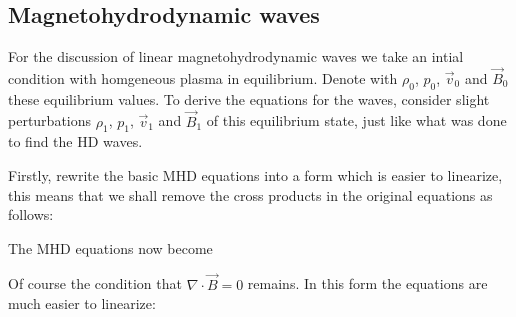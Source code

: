 \subsection{Magnetohydrodynamic waves}
For the discussion of linear magnetohydrodynamic waves we take an intial condition with homgeneous plasma in equilibrium.
Denote with $\rho_0$, $p_0$, $\vec{v}_0$ and $\vec{B}_0$ these equilibrium values. 
To derive the equations for the waves, consider slight perturbations $\rho_1$, $p_1$, $\vec{v}_1$ and $\vec{B}_1$ of this equilibrium state, just like what was done to find the HD waves.

Firstly, rewrite the basic MHD equations into a form which is easier to linearize,
this means that we shall remove the cross products in the original equations as follows:

{\centering 
{}
\par}


The MHD equations now become

{\centering 
\noindent {}
\par}

Of course the condition that $ \nabla \cdot \vec{B} = 0  $ remains. In this form the equations are much easier to linearize:

